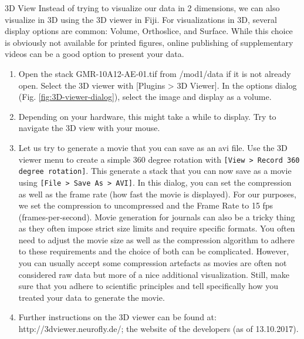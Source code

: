 \newpage
\begin{taskbox}{3D View}
Instead of trying to visualize our data in 2 dimensions, we can also visualize in 3D using the 3D viewer in Fiji. For visualizations in 3D, several display options are common: Volume, Orthoslice, and Surface. While this choice is obviously not available for printed figures, online publishing of supplementary videos can be a good option to present your data.

\begin{enumerate}
	\item Open the stack GMR-10A12-AE-01.tif from /mod1/data if it is not already open. Select the 3D viewer with [Plugins > 3D Viewer]. In the options dialog (Fig. \ref{fig:3D-viewer-dialog}), select the image and display as a volume.	
	
	\begin{minipage}[t]{\linewidth}
		\begin{center}
		\medskip
		\label{fig:3D-viewer-dialog}
		\end{center}
	\end{minipage}
	
	\item Depending on your hardware, this might take a while to display. Try to navigate the 3D view with your mouse. 
	\item Let us try to generate a movie that you can save as an avi file. Use the 3D viewer menu to create a simple 360 degree rotation with \texttt{[View > Record 360 degree rotation]}. This generate a stack that you can now save as a movie using \texttt{[File > Save As > AVI]}. In this dialog, you can set the compression as well as the frame rate (how fast the movie is displayed). For our purposes, we set the compression to uncompressed and the Frame Rate to 15 fps (frames-per-second). Movie generation for journals can also be a tricky thing as they often impose strict size limits and require specific formats. You often need to adjust the movie size as well as the compression algorithm to adhere to these requirements and the choice of both can be complicated. However, you can usually accept some compression artefacts as movies are often not considered raw data but more of a nice additional visualization. Still, make sure that you adhere to scientific principles and tell specifically how you treated your data to generate the movie.
	\item Further instructions on the 3D viewer can be found at: http://3dviewer.neurofly.de/; the website of the developers (as of 13.10.2017).
\end{enumerate}

\end{taskbox}

